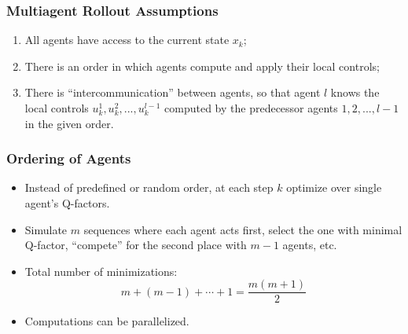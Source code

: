 \documentclass{beamer}
\begin{document}
    \begin{frame}
        \frametitle{Multiagent Rollout Assumptions}

        \begin{enumerate}
            \item All agents have access to the current state $x_k$;

            \item There is an order in which agents compute and apply
            their local controls;

            \item There is ``intercommunication'' between agents,
            so that agent $l$ knows the local controls
            $u_k^1, u_k^2, ..., u_k^{l-1}$
            computed by the
            predecessor agents    $1, 2, ..., l-1$
            in the given order.
        \end{enumerate}


    \end{frame}



    \begin{frame}

        \frametitle{Ordering of Agents}



        \begin{itemize}
            \item Instead of predefined or random order,
            at each step $k$ optimize over single
            agent's Q-factors.

            \item Simulate $m$ sequences where each agent
            acts first, select the one with minimal Q-factor,
            ``compete'' for the second place with $m-1$ agents,
            etc.

            \item Total number of minimizations:
            $$
            m+(m-1)+\cdots+1=\frac{m(m+1)}{2}
            $$


            \item Computations can be parallelized.
        \end{itemize}


    \end{frame}
\end{document}
